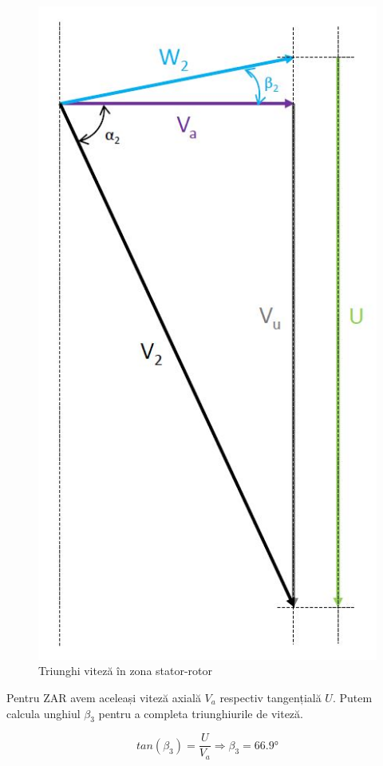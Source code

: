 \begin{figure}[h!]
	\centering
	\includegraphics[scale=0.6]{figures/triunghi_viteza_ZSR.jpg}
	\caption{Triunghi viteză în zona stator-rotor}
	\label{Triunghi viteză în zona stator-rotor}
\end{figure}

\clearpage

Pentru ZAR avem aceleași viteză axială $V_a$ respectiv tangențială $U$. Putem calcula unghiul $\beta_3$ pentru a completa triunghiurile de viteză.

\begin{equation}
tan(\beta_{3})=\frac{U}{V_a} \Rightarrow \beta_{3} =66.9\si{\degree}
\end{equation}

